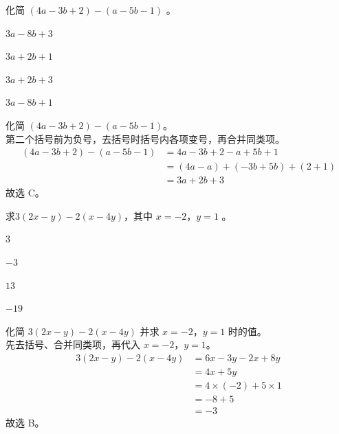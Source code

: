 \documentclass[12pt,a4paper,fontset=none]{exam-zh}
\begin{document}
\begin{question}
    化简 $(4a-3b+2)-(a-5b-1)$ \paren[C]。
    \begin{choices}
        \item $3a-8b+3$
        \item $3a+2b+1$
        \item $3a+2b+3$
        \item $3a-8b+1$
    \end{choices}
\end{question}

\begin{solution}
    化简 $(4a-3b+2)-(a-5b-1)$。 \\
    第二个括号前为负号，去括号时括号内各项变号，再合并同类项。
    \begin{align*}
        (4a-3b+2)-(a-5b-1) &= 4a-3b+2-a+5b+1 \\
        &= (4a-a)+(-3b+5b)+(2+1) \\
        &= 3a+2b+3
    \end{align*}
    故选 C。
\end{solution}

\begin{question}
    求$3(2x-y)-2(x-4y)$，其中 $x=-2$，$y=1$ \paren[B]。
    \begin{choices}
        \item $3$
        \item $-3$
        \item $13$
        \item $-19$
    \end{choices}
\end{question}

\begin{solution}
    化简 $3(2x-y)-2(x-4y)$ 并求 $x=-2$，$y=1$ 时的值。 \\
    先去括号、合并同类项，再代入 $x=-2$，$y=1$。
    \begin{align*}
        3(2x-y)-2(x-4y) &= 6x-3y-2x+8y \\
        &= 4x+5y \\
        &= 4\times(-2)+5\times 1 \\
        &= -8+5 \\
        &= -3
    \end{align*}
    故选 B。
\end{solution}
\end{document}

